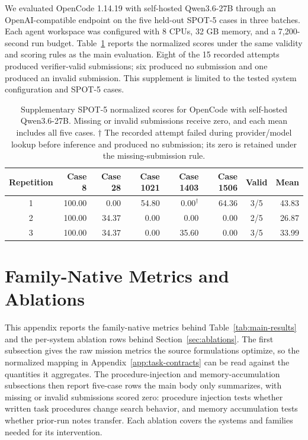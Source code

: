 \documentclass[]{mosi}
\begin{document}
We evaluated OpenCode 1.14.19 with self-hosted Qwen3.6-27B through an OpenAI-compatible endpoint on the five held-out SPOT-5 cases in three batches. Each agent workspace was configured with 8 CPUs, 32 GB memory, and a 7,200-second run budget. Table~\ref{tab:qwen-supplement} reports the normalized scores under the same validity and scoring rules as the main evaluation. Eight of the 15 recorded attempts produced verifier-valid submissions; six produced no submission and one produced an invalid submission. This supplement is limited to the tested system configuration and SPOT-5 cases.

\begin{table}[!t]
\centering
\small
\setlength{\tabcolsep}{6pt}
\begin{tabular}{crrrrrcr}
\hline
\rowcolor{headerrow}
Repetition & Case 8 & Case 28 & Case 1021 & Case 1403 & Case 1506 & Valid & Mean \\
\hline
1 & 100.00 & 0.00 & 54.80 & \(0.00^{\dagger}\) & 64.36 & 3/5 & 43.83 \\
2 & 100.00 & 34.37 & 0.00 & 0.00 & 0.00 & 2/5 & 26.87 \\
3 & 100.00 & 34.37 & 0.00 & 35.60 & 0.00 & 3/5 & 33.99 \\
\hline
\end{tabular}
\caption{Supplementary SPOT-5 normalized scores for OpenCode with self-hosted Qwen3.6-27B. Missing or invalid submissions receive zero, and each mean includes all five cases. \(\dagger\) The recorded attempt failed during provider/model lookup before inference and produced no submission; its zero is retained under the missing-submission rule.}
\label{tab:qwen-supplement}
\end{table}

\clearpage
\section{Family-Native Metrics and Ablations}
\label{app:ablation-results}

This appendix reports the family-native metrics behind Table~\ref{tab:main-results} and the per-system ablation rows behind Section~\ref{sec:ablations}. The first subsection gives the raw mission metrics the source formulations optimize, so the normalized mapping in Appendix~\ref{app:task-contracts} can be read against the quantities it aggregates. The procedure-injection and memory-accumulation subsections then report five-case rows the main body only summarizes, with missing or invalid submissions scored zero: procedure injection tests whether written task procedures change search behavior, and memory accumulation tests whether prior-run notes transfer. Each ablation covers the systems and families needed for its intervention.
\end{document}
